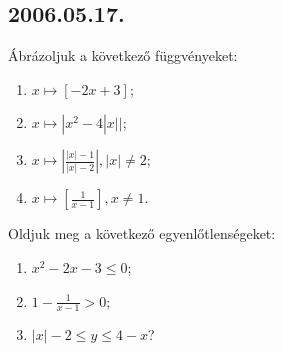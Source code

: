 \documentclass{article}
\begin{document}
\subsection*{2006.05.17.}
Ábrázoljuk a következő függvényeket:
\begin{enumerate}
\item $x \mapsto [-2x+3]$;
\item $x \mapsto |x^2-4|x||$;
\item $x \mapsto \left|\frac{|x|-1}{|x|-2}\right|, |x|\neq2$;
\item $x \mapsto \left[\frac{1}{x-1}\right], x\neq1$.
\end{enumerate}
Oldjuk meg a következő egyenlőtlenségeket:
\begin{enumerate}
\item $x^2-2x-3 \le 0$;
\item $1-\frac{1}{x-1}>0$;
\item $|x|-2 \le y \le 4-x$?
\end{enumerate}
\end{document}
